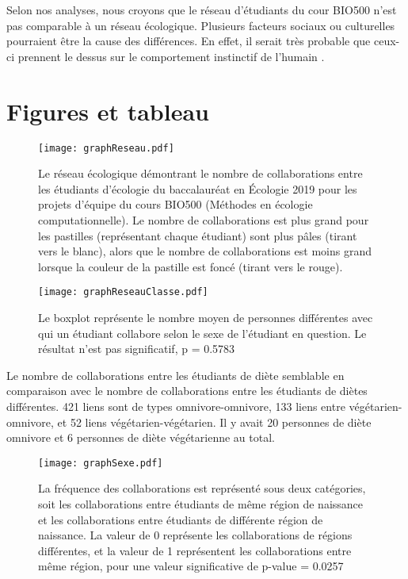 \documentclass[twoside,twocolumn]{article}
\begin{document}
Selon nos analyses, nous croyons que le réseau d'étudiants du cour BIO500 n'est pas comparable à un réseau écologique. Plusieurs facteurs sociaux ou culturelles pourraient être la cause des différences. En effet, il serait très probable que ceux-ci prennent le dessus sur le comportement instinctif de l'humain \citep{nicholson1998hardwired}.





\section{Figures et tableau}

\begin{figure}[h]
\texttt{[image: graphReseau.pdf]}
\caption {Le réseau écologique démontrant le nombre de collaborations entre les étudiants d'écologie du baccalauréat en Écologie 2019 pour les projets d'équipe du cours BIO500 (Méthodes en écologie computationnelle). Le nombre de collaborations est plus grand pour les pastilles (représentant chaque étudiant) sont plus pâles (tirant vers le blanc), alors que le nombre de collaborations est moins grand lorsque la couleur de la pastille est foncé (tirant vers le rouge).}
\end{figure}

\begin{figure}[h]
\texttt{[image: graphReseauClasse.pdf]}
\caption {Le boxplot représente le nombre moyen de personnes différentes avec qui un étudiant collabore selon le sexe de l'étudiant en question. Le résultat n'est pas significatif, p = 0.5783}
\end{figure}

\begin{table}[h]
\resizebox{\linewidth}{!}{

}
\caption{Le nombre de collaborations entre les étudiants de diète semblable en comparaison avec le nombre de collaborations entre les étudiants de diètes différentes. 421 liens sont de types omnivore-omnivore, 133 liens entre végétarien-omnivore, et 52 liens végétarien-végétarien. Il y avait 20 personnes de diète omnivore et 6 personnes de diète végétarienne au total.}
\end{table}


\begin{figure}[h]
\texttt{[image: graphSexe.pdf]}
\caption {La fréquence des collaborations est représenté sous deux catégories, soit les collaborations entre étudiants de même région de naissance et les collaborations entre étudiants de différente région de naissance. La valeur de 0 représente les collaborations de régions différentes, et la valeur de 1 représentent les collaborations entre même région, pour une valeur significative de p-value = 0.0257}
\end{figure}
\end{document}
